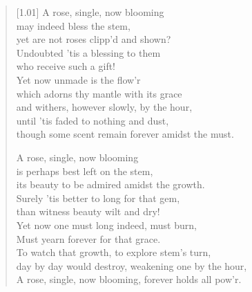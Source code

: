 \begin{verse}[1.01\textwidth]
  A rose, single, now blooming\\
  \vin may indeed bless the stem,\\
  yet are not roses clipp’d and shown?\\
  \vin Undoubted 'tis a blessing to them\\
  who receive such a gift!\\
  \vin Yet now unmade is the flow’r\\
  which adorns thy mantle with its grace\\
  \vin and withers, however slowly, by the hour,\\
  \vin \vin until 'tis faded to nothing and dust,\\
  \vin \vin though some scent remain forever amidst the must.

  A rose, single, now blooming\\
  \vin is perhaps best left on the stem,\\
  its beauty to be admired amidst the growth.\\
  \vin Surely 'tis better to long for that gem,\\
  than witness beauty wilt and dry!\\
  \vin Yet now one must long indeed, must burn,\\
  Must yearn forever for that grace.\\
  \vin To watch that growth, to explore stem's turn,\\
  \vin \vin day by day would destroy, weakening one by the hour,\\
  \vin \vin A rose, single, now blooming, forever holds all pow'r.
\end{verse}
